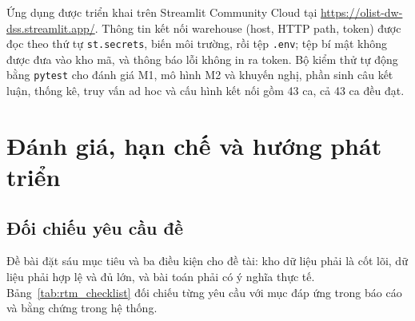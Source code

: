 \documentclass[a4paper]{article}
\begin{document}
Ứng dụng được triển khai trên Streamlit Community Cloud tại \url{https://olist-dw-dss.streamlit.app/}. Thông tin kết nối warehouse (host, HTTP path, token) được đọc theo thứ tự \texttt{st.secrets}, biến môi trường, rồi tệp \texttt{.env}; tệp bí mật không được đưa vào kho mã, và thông báo lỗi không in ra token. Bộ kiểm thử tự động bằng \texttt{pytest} cho đánh giá M1, mô hình M2 và khuyến nghị, phần sinh câu kết luận, thống kê, truy vấn ad hoc và cấu hình kết nối gồm 43 ca, cả 43 ca đều đạt.

\section{Đánh giá, hạn chế và hướng phát triển}
\label{sec:ch6}

\subsection{Đối chiếu yêu cầu đề}
\label{subsec:6_1}

Đề bài đặt sáu mục tiêu và ba điều kiện cho đề tài: kho dữ liệu phải là cốt lõi, dữ liệu phải hợp lệ và đủ lớn, và bài toán phải có ý nghĩa thực tế. Bảng~\ref{tab:rtm_checklist} đối chiếu từng yêu cầu với mục đáp ứng trong báo cáo và bằng chứng trong hệ thống.
\end{document}
